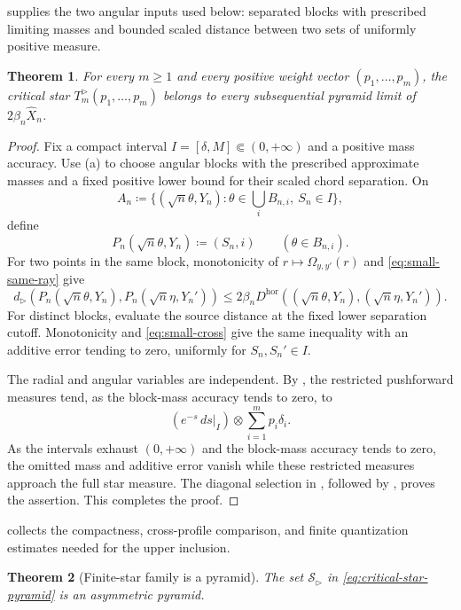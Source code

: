 \documentclass[10pt,a4paper]{amsart}
\numberwithin{equation}{section}
\newtheorem{theorem}{Theorem}[section]
\begin{document}
 supplies the two angular inputs used below: separated blocks with prescribed limiting masses and bounded scaled distance between two sets of uniformly positive measure.

\begin{theorem}\label{thm:finite-star-lower}
For every $m\ge1$ and every positive weight vector $(p_1,\ldots,p_m)$, the critical star $T_m^{\rhd}(p_1,\ldots,p_m)$ belongs to every subsequential pyramid limit of $2\beta_n\widehat X_n$.
\end{theorem}

\begin{proof}
Fix a compact interval $I=[\delta,M]\Subset(0,+\infty)$ and a positive mass accuracy.  Use (a) to choose angular blocks with the prescribed approximate masses and a fixed positive lower bound for their scaled chord separation.  On
\[ A_n\coloneqq\{(\sqrt n\theta,Y_n)\colon \theta\in\textstyle\bigcup_iB_{n,i},\ S_n\in I\}, \]
define
\[ P_n(\sqrt n\theta,Y_n)\coloneqq(S_n,i) \qquad(\theta\in B_{n,i}). \]
For two points in the same block, monotonicity of $r\mapsto\Omega_{y,y'}(r)$ and \eqref{eq:small-same-ray} give
\[ d_{\rhd}(P_n(\sqrt n\theta,Y_n),P_n(\sqrt n\eta,Y_n')) \le2\beta_nD^{\mathrm{hor}}((\sqrt n\theta,Y_n),(\sqrt n\eta,Y_n')). \]
For distinct blocks, evaluate the source distance at the fixed lower separation cutoff.  Monotonicity and \eqref{eq:small-cross} give the same inequality with an additive error tending to zero, uniformly for $S_n,S_n'\in I$.

The radial and angular variables are independent.  By , the restricted pushforward measures tend, as the block-mass accuracy tends to zero, to
\[ (e^{-s}\,ds|_I)\otimes\sum_{i=1}^mp_i\delta_i. \]
As the intervals exhaust $(0,+\infty)$ and the block-mass accuracy tends to zero, the omitted mass and additive error vanish while these restricted measures approach the full star measure.  The diagonal selection in , followed by , proves the assertion.
	This completes the proof.
\end{proof}

 collects the compactness, cross-profile comparison, and finite quantization estimates needed for the upper inclusion.

\begin{theorem}[Finite-star family is a pyramid]\label{thm:finite-star-pyramid}
The set $\mathcal S_{\rhd}$ in \eqref{eq:critical-star-pyramid} is an asymmetric pyramid.
\end{theorem}
\end{document}
